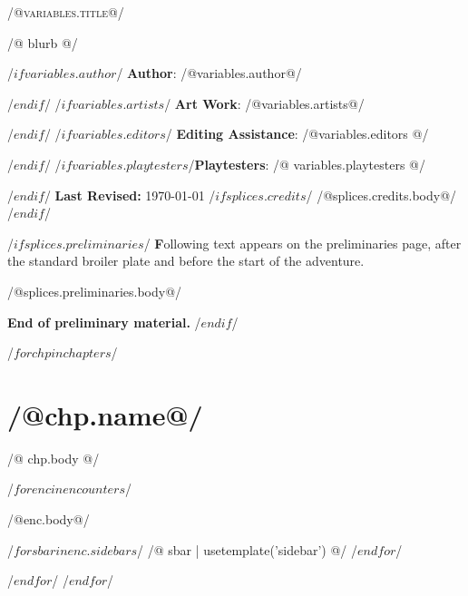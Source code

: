 \documentclass[12pt,openany]{book}
\begin{document}

\centerline{\scshape\Huge /@variables.title@/}

/@ blurb @/


/$ if variables.author $/ \noindent \textbf{Author}: /@variables.author@/ \par /$endif$/
/$ if variables.artists $/ \noindent \textbf{Art Work}: /@variables.artists@/ \par /$endif$/
/$ if variables.editors $/ \noindent \textbf{Editing Assistance}: /@variables.editors @/ \par /$endif$/
/$ if variables.playtesters $/\noindent \textbf{Playtesters}: /@ variables.playtesters @/ \par /$ endif $/
\noindent \textbf{Last Revised:} \today
\vspace*{0.35in}
/$ if splices.credits $/
/@splices.credits.body@/
\vspace*{0.35in}
/$ endif $/


/$ if splices.preliminaries $/
{\textbf Following text appears on the preliminaries page, after the standard broiler plate and 
before the start of the adventure.}

/@splices.preliminaries.body@/

\textbf{End of preliminary material.}
/$ endif $/

/$ for chp in chapters $/

\chapter{/@chp.name@/}
\label{chapter_/@chp.label@/}

/@ chp.body @/

/$ for enc in encounters $/
\label{enc_/@enc.label@/}

/@enc.body@/


/$ for sbar in enc.sidebars $/
/@ sbar | usetemplate('sidebar') @/
/$ endfor $/

/$ endfor $/
/$ endfor $/
\end{document}
